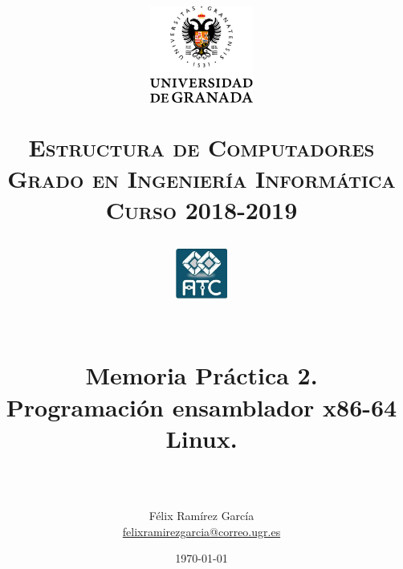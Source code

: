 
\usepackage{url}

\title{	
	\normalfont \normalsize
	\begin{figure}[htb]
		\centering
		\includegraphics[width=0.3\textwidth]{./imagenes/1}
	\end{figure}
	\textsc{\textbf{Estructura de Computadores} \\ Grado en Ingeniería Informática \\ 
	Curso 2018-2019} \\ [25pt] %
	\begin{figure}[htb]
		\centering
		\includegraphics[width=0.15\textwidth]{./imagenes/2}
	\end{figure}
	\horrule{0.5pt} \\[0.4cm] %
	\huge Memoria Práctica 2. \\
	\huge Programaci\'on ensamblador x86-64 Linux.
	\\ %
	\horrule{2pt} \\[0.5cm] %
}
\author{Félix Ramírez García  \\
\href{mailto:felixramirezgarcia@correo.ugr.es}{felixramirezgarcia@correo.ugr.es}} %
\date{\normalsize\today} %



	
	\maketitle %
	
	\newpage %
	
